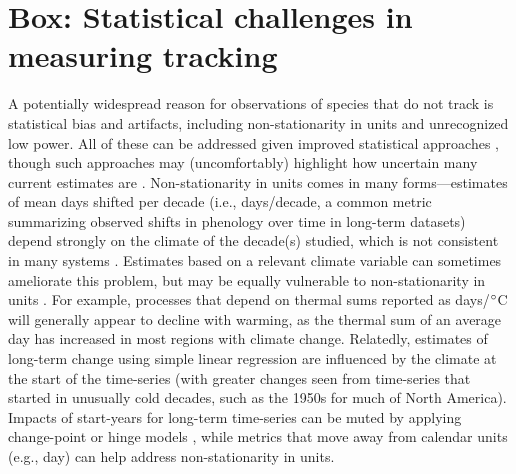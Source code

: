 \documentclass[11pt,letterpaper]{article}
\begin{document}
\section{Box: Statistical challenges in measuring tracking} %
A potentially widespread reason for observations of species that do not track is statistical bias and artifacts, including non-stationarity in units and unrecognized low power. All of these can be addressed given improved statistical approaches \citep[e.g.,][]{gienapp2005,pearse2017}, though such approaches may (uncomfortably) highlight how uncertain many current estimates are \citep{brown2016}. Non-stationarity in units comes in many forms---estimates of mean days shifted per decade (i.e., days/decade, a common metric summarizing observed shifts in phenology over time in long-term datasets) depend strongly on the climate of the decade(s) studied, which is not consistent in many systems \citep{Ault2011,McCabe2012}. Estimates based on a relevant climate variable can sometimes ameliorate this problem, but may be equally vulnerable to non-stationarity in units \citep[e.g.,][]{Sagarin:2001fu}. For example, processes that depend on thermal sums reported as days/$\degree$C will generally appear to decline with warming, as the thermal sum of an average day has increased in most regions with climate change. Relatedly, estimates of long-term change using simple linear regression are influenced by the climate at the start of the time-series (with greater changes seen from time-series that started in unusually cold decades, such as the 1950s for much of North America). Impacts of start-years for long-term time-series can be muted by applying change-point or hinge models \citep[e.g.,][]{kharouba2018}, while metrics that move away from calendar units (e.g., day) can help address non-stationarity in units. 
\end{document}
